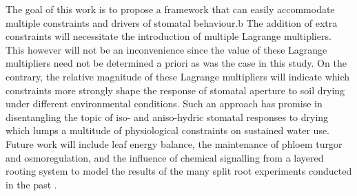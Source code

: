\documentclass[utf8]{frontiersSCNS} %
\begin{document}
The goal of this work is to propose a framework that can easily accommodate multiple constraints and drivers of stomatal behaviour.b The addition of extra constraints will necessitate the introduction of multiple Lagrange multipliers. This however will not be an inconvenience since the value of these Lagrange multipliers need not be determined a priori as was the case in this study. On the contrary, the relative magnitude of these Lagrange multipliers will indicate which constraints more strongly shape the response of stomatal aperture to soil drying under different environmental conditions. Such an approach has promise in disentangling the topic of iso- and aniso-hydric stomatal responses to drying which lumps a multitude of physiological constraints on sustained water use.   Future work will include leaf energy balance, the maintenance of phloem turgor and osmoregulation, and the influence of chemical signalling from a layered rooting system to model the results of the many split root experiments conducted in the past \citep{blackman1985root, zhang1987control}. 







\end{document}
